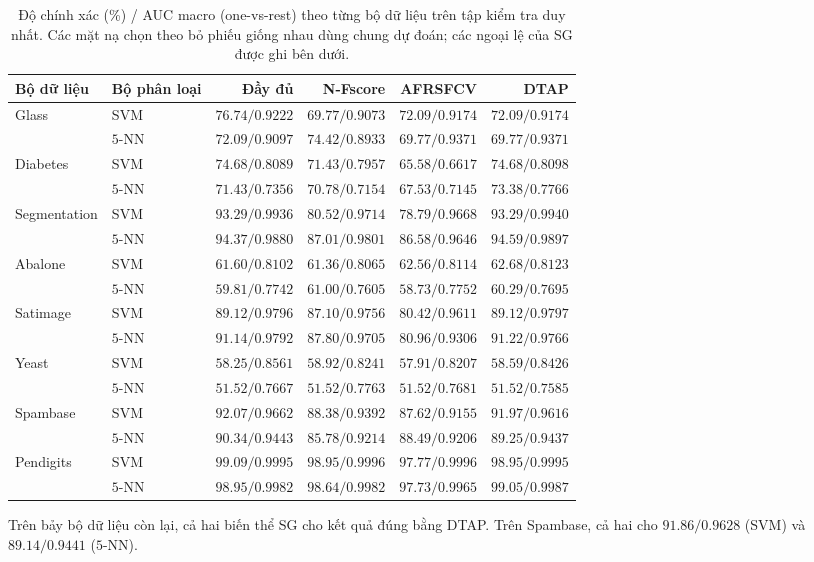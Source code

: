 \documentclass[]{interact}
\theoremstyle{plain}
\theoremstyle{definition}
\theoremstyle{remark}
\begin{document}
\begin{table}[htbp]
\centering\small\setlength{\tabcolsep}{4pt}
\caption{Độ chính xác (\%) / AUC macro (one-vs-rest) theo từng bộ dữ liệu trên tập kiểm tra duy nhất. Các mặt nạ chọn theo bỏ phiếu giống nhau dùng chung dự đoán; các ngoại lệ của SG được ghi bên dưới.}\label{tab:acc}
\begin{tabular}{llrrrr}
\toprule
Bộ dữ liệu & Bộ phân loại & Đầy đủ & N-Fscore & AFRSFCV & DTAP \\
\midrule
Glass & SVM & $76.74/0.9222$ & $69.77/0.9073$ & $72.09/0.9174$ & $72.09/0.9174$ \\
 & $5$-NN & $72.09/0.9097$ & $74.42/0.8933$ & $69.77/0.9371$ & $69.77/0.9371$ \\
Diabetes & SVM & $74.68/0.8089$ & $71.43/0.7957$ & $65.58/0.6617$ & $74.68/0.8098$ \\
 & $5$-NN & $71.43/0.7356$ & $70.78/0.7154$ & $67.53/0.7145$ & $73.38/0.7766$ \\
Segmentation & SVM & $93.29/0.9936$ & $80.52/0.9714$ & $78.79/0.9668$ & $93.29/0.9940$ \\
 & $5$-NN & $94.37/0.9880$ & $87.01/0.9801$ & $86.58/0.9646$ & $94.59/0.9897$ \\
Abalone & SVM & $61.60/0.8102$ & $61.36/0.8065$ & $62.56/0.8114$ & $62.68/0.8123$ \\
 & $5$-NN & $59.81/0.7742$ & $61.00/0.7605$ & $58.73/0.7752$ & $60.29/0.7695$ \\
Satimage & SVM & $89.12/0.9796$ & $87.10/0.9756$ & $80.42/0.9611$ & $89.12/0.9797$ \\
 & $5$-NN & $91.14/0.9792$ & $87.80/0.9705$ & $80.96/0.9306$ & $91.22/0.9766$ \\
Yeast & SVM & $58.25/0.8561$ & $58.92/0.8241$ & $57.91/0.8207$ & $58.59/0.8426$ \\
 & $5$-NN & $51.52/0.7667$ & $51.52/0.7763$ & $51.52/0.7681$ & $51.52/0.7585$ \\
Spambase & SVM & $92.07/0.9662$ & $88.38/0.9392$ & $87.62/0.9155$ & $91.97/0.9616$ \\
 & $5$-NN & $90.34/0.9443$ & $85.78/0.9214$ & $88.49/0.9206$ & $89.25/0.9437$ \\
Pendigits & SVM & $99.09/0.9995$ & $98.95/0.9996$ & $97.77/0.9996$ & $98.95/0.9995$ \\
 & $5$-NN & $98.95/0.9982$ & $98.64/0.9982$ & $97.73/0.9965$ & $99.05/0.9987$ \\
\bottomrule
\end{tabular}
\par\smallskip\begin{minipage}{0.97\textwidth}\footnotesize Trên bảy bộ dữ liệu còn lại, cả hai biến thể SG cho kết quả đúng bằng DTAP. Trên Spambase, cả hai cho $91.86/0.9628$ (SVM) và $89.14/0.9441$ ($5$-NN). \end{minipage}
\end{table}
\end{document}
